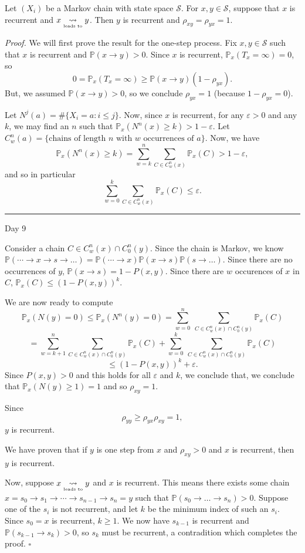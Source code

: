 \documentclass{problemset}
\renewcommand{\P}{\mathbb{P}}
\newcommand{\ldsto}{\underset{\text{\tiny leads to}}{\leadsto}}
\newcommand{\fatrule}[1]{\vspace{.3cm}\hrule {\hfill \sf #1}\par}
\newenvironment{proof}{\emph{Proof.}}{\hfill$\square$}
\begin{document}
	\begin{theorem}
		Let $(X_i)$ be a Markov chain with state space $\mathcal S$.
		For $x,y\in \mathcal S$, suppose that $x$ is recurrent and $x\ldsto y$.  Then $y$
		is recurrent and $\rho_{xy}=\rho_{yx}=1$.
	\end{theorem}
	\begin{proof}
		We will first prove the result for the one-step process.
		Fix $x,y\in\mathcal S$ such that $x$ is recurrent and $\P(x\to y)>0$.
		Since $x$ is recurrent, $\P_x(T_x=\infty) = 0$, so
		\[
			0=\P_x(T_x=\infty) \geq \P(x\to y)(1-\rho_{yx}).
		\]
		But, we assumed $\P(x\to y)>0$, so we conclude $\rho_{yx}=1$ (because $1-\rho_{yx}=0$).

		Let $N^j(a) = \#\{X_i=a: i \leq j\}$.
		Now, since $x$ is recurrent, for any $\varepsilon>0$ and any $k$, we may find an $n$ such
		that $\P_x(N^n(x)\geq k) > 1-\varepsilon$.  Let $C_w^n(a)=\{\text{chains of length $n$ with $w$ 
		occurrences of $a$}\}$.
		Now, we have
		\[
			\P_x(N^n(x)\geq k) = \sum_{w=k}^n \sum_{C\in C_w^n(x)} \P_x(C) > 1-\varepsilon,
		\]
		and so in particular
		\[
			\sum_{w=0}^k \sum_{C\in C_w^n(x)} \P_x(C) \leq \varepsilon.
		\]


	\fatrule{Day 9}
		
		Consider a chain $C\in C_w^n(x)\cap C_0^n(y)$.  Since the chain is Markov, we know
		$\P(\cdots\to x\to s\to\ldots) = \P(\cdots\to x)\P(x\to s)\P(s\to\ldots)$.  
		Since there are no occurrences of $y$, $\P(x\to s) = 1-P(x,y)$. Since there are $w$ occurences
		of $x$ in $C$, $\P_x(C) \leq (1-P(x,y))^k$.

		We are now ready to compute
		\[
			\P_x(N(y)=0) \leq \P_x(N^n(y)=0) = \sum_{w=0}^n \ \sum_{C\in C_w^n(x)\cap C_0^n(y)} \P_x(C)
		\]\[
			=\sum_{w=k+1}^n \sum_{C\in C_w^n(x)\cap C_0^n(y)} \P_x(C)
			+\sum_{w=0}^k \ \sum_{C\in C_w^n(x)\cap C_0^n(y)} \P_x(C)
		\]\[
			\leq (1-P(x,y))^k + \varepsilon.
		\]
		Since $P(x,y)>0$ and this holds for all $\varepsilon$ and $k$, we conclude that, we conclude that 
		$\P_x(N(y)\geq 1)=1$ and so $\rho_{xy}=1$.

		Since 
		\[
			\rho_{yy} \geq \rho_{yx}\rho_{xy}=1,
		\]
		$y$ is recurrent.
		
		We have proven that if $y$ is one step from $x$ and $\rho_{xy}>0$ and $x$ is recurrent, 
		then $y$ is recurrent.

		Now, suppose $x\ldsto y$ and $x$ is recurrent.  This means there exists some chain $x=s_0\to s_1\to\cdots \to s_{n-1}\to s_n=y$
		such that $\P(s_0\to\ldots\to s_n)>0$.  Suppose one of the $s_i$ is not recurrent, and let $k$ be the minimum
		index of such an $s_i$.  Since $s_0=x$ is recurrent, $k\geq 1$.  We now have $s_{k-1}$ is recurrent and
		$\P(s_{k-1}\to s_k) > 0$, so $s_k$ must be recurrent, a contradition which completes the proof.
	\end{proof}
\end{document}
